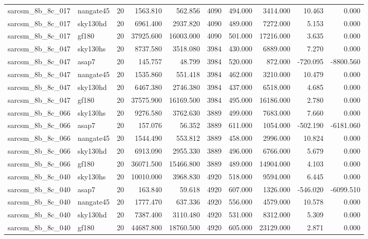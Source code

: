 \documentclass{article}
\begin{document}
\begin{longtable}{llrrrrrrrr}
sarcsm\_8b\_8c\_017 & nangate45 & 20 & 1563.810 & 562.856 & 4090 & 494.000 & 3414.000 & 10.463 & 0.000 \\
sarcsm\_8b\_8c\_017 & sky130hd & 20 & 6961.400 & 2937.820 & 4090 & 489.000 & 7272.000 & 5.153 & 0.000 \\
sarcsm\_8b\_8c\_017 & gf180 & 20 & 37925.600 & 16003.000 & 4090 & 501.000 & 17216.000 & 3.635 & 0.000 \\
sarcsm\_8b\_8c\_047 & sky130hs & 20 & 8737.580 & 3518.080 & 3984 & 430.000 & 6889.000 & 7.270 & 0.000 \\
sarcsm\_8b\_8c\_047 & asap7 & 20 & 145.757 & 48.799 & 3984 & 520.000 & 872.000 & -720.095 & -8800.560 \\
sarcsm\_8b\_8c\_047 & nangate45 & 20 & 1535.860 & 551.418 & 3984 & 462.000 & 3210.000 & 10.479 & 0.000 \\
sarcsm\_8b\_8c\_047 & sky130hd & 20 & 6467.380 & 2746.380 & 3984 & 437.000 & 6518.000 & 4.685 & 0.000 \\
sarcsm\_8b\_8c\_047 & gf180 & 20 & 37575.900 & 16169.500 & 3984 & 495.000 & 16186.000 & 2.780 & 0.000 \\
sarcsm\_8b\_8c\_066 & sky130hs & 20 & 9276.580 & 3762.630 & 3889 & 499.000 & 7683.000 & 7.660 & 0.000 \\
sarcsm\_8b\_8c\_066 & asap7 & 20 & 157.076 & 56.352 & 3889 & 611.000 & 1054.000 & -502.190 & -6181.060 \\
sarcsm\_8b\_8c\_066 & nangate45 & 20 & 1544.490 & 553.812 & 3889 & 458.000 & 2996.000 & 10.824 & 0.000 \\
sarcsm\_8b\_8c\_066 & sky130hd & 20 & 6913.090 & 2955.330 & 3889 & 496.000 & 6766.000 & 5.679 & 0.000 \\
sarcsm\_8b\_8c\_066 & gf180 & 20 & 36071.500 & 15466.800 & 3889 & 489.000 & 14904.000 & 4.103 & 0.000 \\
sarcsm\_8b\_8c\_040 & sky130hs & 20 & 10010.000 & 3968.830 & 4920 & 518.000 & 9594.000 & 6.445 & 0.000 \\
sarcsm\_8b\_8c\_040 & asap7 & 20 & 163.840 & 59.618 & 4920 & 607.000 & 1326.000 & -546.020 & -6099.510 \\
sarcsm\_8b\_8c\_040 & nangate45 & 20 & 1777.470 & 637.336 & 4920 & 556.000 & 4579.000 & 10.578 & 0.000 \\
sarcsm\_8b\_8c\_040 & sky130hd & 20 & 7387.400 & 3110.480 & 4920 & 531.000 & 8312.000 & 5.309 & 0.000 \\
sarcsm\_8b\_8c\_040 & gf180 & 20 & 44687.800 & 18760.500 & 4920 & 605.000 & 23129.000 & 2.871 & 0.000 \\

\end{longtable}
\end{document}
